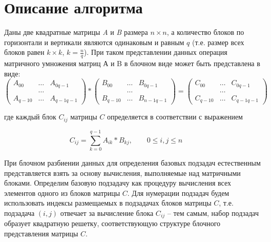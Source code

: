 \documentclass{report}
\begin{document}
\section*{Описание алгоритма}
Даны две квадратные матрицы {\itshape A} и {\itshape B} размера {\itshape $n \times n$}, а количество блоков по горизонтали и вертикали являются одинаковым и равным {\itshape $q$} (т.е. размер всех блоков равен {\itshape $k \times k$}, {\itshape $k = \frac{n}{q} $}). При таком представлении данных операция матричного умножения матриц А и B в блочном виде может быть представлена в виде:
$$
\begin{pmatrix}
A_{00}& \ldots & A_{0q-1}\\
& \ldots\\
A_{q-10}& \ldots & A_{q-1q-1}
\end{pmatrix}
*
\begin{pmatrix}
B_{00}& \ldots & B_{0q-1}\\
& \ldots\\
B_{q-10}& \ldots & B_{n-1q-1}
\end{pmatrix}
=
\begin{pmatrix}
C_{00}& \ldots & C_{0q-1}\\
&\ldots\\
C_{q-10}& \ldots & C_{q-1q-1}
\end{pmatrix}
$$

где каждый блок $C_{ij}$ матрицы {\itshape $C$} определяется в соответствии с выражением
\par$$
    C_{ij} = \sum_{k=0}^{q-1} A_{ik} * B_{kj},\qquad 0 \le i,j \le n \qquad
    $$
\par При блочном разбиении данных для определения базовых подзадач естественным представляется взять за основу вычисления, выполняемые над матричными блоками. Определим базовую подзадачу как процедуру вычисления всех элементов одного из блоков матрицы {\itshape $C$}. Для нумерации подзадач будем использовать индексы размещаемых в подзадачах блоков матрицы {\itshape $C$}, т.е. подзадача {\itshape $(i,j)$} отвечает за вычисление блока {\itshape $C_{ij}$} – тем самым, набор подзадач образует квадратную решетку, соответствующую структуре блочного представления матрицы {\itshape $C$}.
\end{document}
